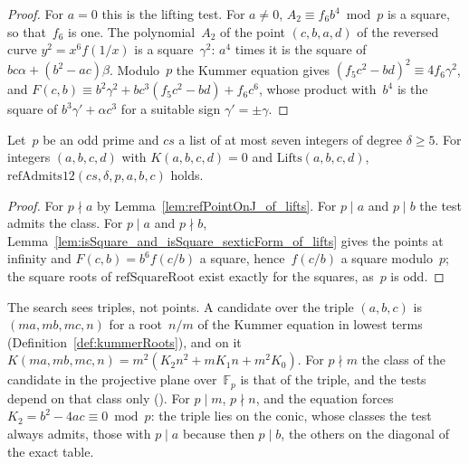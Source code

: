 \begin{proof}
  \leanok
  For $a = 0$ this is the lifting test. For $a \ne 0$, $A_2 \equiv f_6 b^4 \bmod p$ is a square, so
  that~$f_6$ is one. The polynomial~$A_2$ of the point $(c, b, a, d)$ of the reversed curve
  $y^2 = x^6 f(1/x)$ is a square~$\gamma^2$: $a^4$ times it is the square of
  $b c \alpha + (b^2 - a c) \beta$. Modulo~$p$ the Kummer equation gives
  $(f_5 c^2 - b d)^2 \equiv 4 f_6 \gamma^2$, and
  $F(c, b) \equiv b^2 \gamma^2 + b c^3 (f_5 c^2 - b d) + f_6 c^6$, whose product with~$b^4$ is the
  square of $b^3 \gamma' + \alpha c^3$ for a suitable sign $\gamma' = \pm \gamma$.
\end{proof}

\begin{lemma}\label{lem:refAdmits12_of_lifts}
  \leanok
  Let~$p$ be an odd prime and $\mathit{cs}$ a list of at most seven integers of degree
  $\delta \ge 5$. For integers $(a, b, c, d)$ with $K(a, b, c, d) = 0$ and
  $\mathrm{Lifts}(a, b, c, d)$, $\mathrm{refAdmits12}(\mathit{cs}, \delta, p, a, b, c)$ holds.
\end{lemma}

\begin{proof}
  \leanok
  For $p \nmid a$ by Lemma~\ref{lem:refPointOnJ_of_lifts}. For $p \mid a$ and $p \mid b$ the test
  admits the class. For $p \mid a$ and $p \nmid b$,
  Lemma~\ref{lem:isSquare_and_isSquare_sexticForm_of_lifts} gives the points at infinity and
  $F(c, b) = b^6 f(c / b)$ a square, hence~$f(c/b)$ a square modulo~$p$; the square roots of
  $\mathrm{refSquareRoot}$ exist exactly for the squares, as~$p$ is odd.
\end{proof}

The search sees triples, not points. A candidate over the triple $(a, b, c)$ is $(m a, m b, m c, n)$
for a root~$n/m$ of the Kummer equation in lowest terms (Definition~\ref{def:kummerRoots}), and on
it $K(m a, m b, m c, n) = m^2 (K_2 n^2 + m K_1 n + m^2 K_0)$. For $p \nmid m$ the class of the
candidate in the projective plane over~$\mathbb{F}_p$ is that of the triple, and the tests depend on
that class only (). For $p \mid m$, $p \nmid n$, and the equation
forces $K_2 = b^2 - 4 a c \equiv 0 \bmod p$: the triple lies on the conic, whose classes the test
always admits, those with $p \mid a$ because then $p \mid b$, the others on the diagonal of the
exact table.

